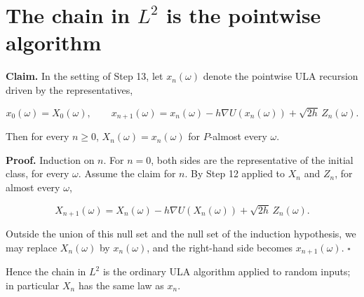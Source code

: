 \documentclass[11pt,a4paper]{article}
\begin{document}
\section{\texorpdfstring{The chain in \(L^2\) is the pointwise algorithm}{The chain in L² is the pointwise algorithm}}


\textbf{Claim.} In the setting of Step 13, let \(x_n(\omega)\) denote the pointwise ULA recursion driven by the representatives,


\[x_0(\omega)=X_0(\omega),\qquad x_{n+1}(\omega)=x_n(\omega)-h\nabla U(x_n(\omega))+\sqrt{2h}\,Z_n(\omega).\]


Then for every \(n\ge0\), \(X_n(\omega)=x_n(\omega)\) for \(P\)-almost every \(\omega\).




\textbf{Proof.} Induction on \(n\). For \(n=0\), both sides are the representative of the initial class, for every \(\omega\). Assume the claim for \(n\). By Step 12 applied to \(X_n\) and \(Z_n\), for almost every \(\omega\),


\[X_{n+1}(\omega)=X_n(\omega)-h\nabla U(X_n(\omega))+\sqrt{2h}\,Z_n(\omega).\]


Outside the union of this null set and the null set of the induction hypothesis, we may replace \(X_n(\omega)\) by \(x_n(\omega)\), and the right-hand side becomes \(x_{n+1}(\omega)\). \(\square\)




Hence the chain in \(L^2\) is the ordinary ULA algorithm applied to random inputs; in particular \(X_n\) has the same law as \(x_n\).
\end{document}
